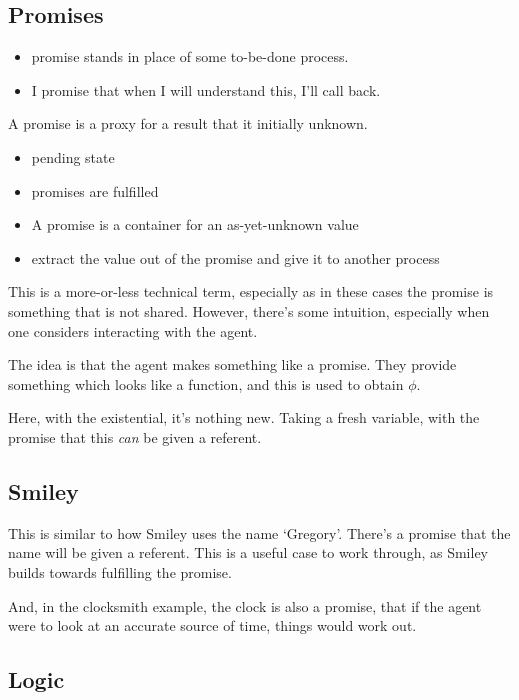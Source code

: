 \documentclass[10pt]{article}
\begin{document}
\subsection{Promises}
\label{sec:promises}

\begin{itemize}
\item promise stands in place of some to-be-done process.
\item I promise that when I will understand this, I'll call back.
\end{itemize}

A promise is a proxy for a result that it initially unknown.

\begin{itemize}
\item pending state
\item promises are fulfilled
\item A promise is a container for an as-yet-unknown value
\item extract the value out of the promise and give it to another process
\end{itemize}


This is a more-or-less technical term, especially as in these cases the promise is something that is not shared.
However, there's some intuition, especially when one considers interacting with the agent.

The idea is that the agent makes something like a promise.
They provide something which looks like a function, and this is used to obtain \(\phi\).

Here, with the existential, it's nothing new.
Taking a fresh variable, with the promise that this \emph{can} be given a referent.

\subsection{Smiley}
\label{sec:smiley}

This is similar to how Smiley uses the name `Gregory'.
There's a promise that the name will be given a referent.
This is a useful case to work through, as Smiley builds towards fulfilling the promise.

And, in the clocksmith example, the clock is also a promise, that if the agent were to look at an accurate source of time, things would work out.

\subsection{Logic}
\label{sec:logic}
\end{document}
